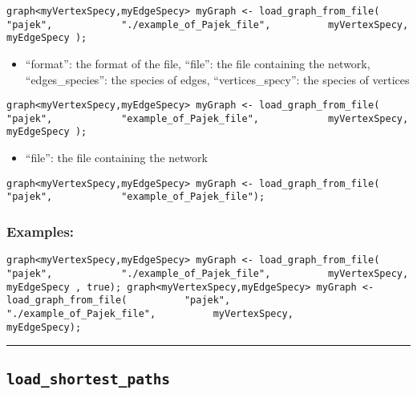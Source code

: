 \documentclass[]{book}
\providecommand{\tightlist}{%
  \setlength{\itemsep}{0pt}\setlength{\parskip}{0pt}}
\theoremstyle{definition}
\theoremstyle{definition}
\theoremstyle{definition}
\theoremstyle{remark}
\begin{document}
\begin{verbatim}
graph<myVertexSpecy,myEdgeSpecy> myGraph <- load_graph_from_file(           "pajek",            "./example_of_Pajek_file",          myVertexSpecy,          myEdgeSpecy ); 
\end{verbatim}

\begin{itemize}
\tightlist
\item
  ``format'': the format of the file, ``file'': the file containing the
  network, ``edges\_species'': the species of edges,
  ``vertices\_specy'': the species of vertices
\end{itemize}

\begin{verbatim}
graph<myVertexSpecy,myEdgeSpecy> myGraph <- load_graph_from_file(           "pajek",            "example_of_Pajek_file",            myVertexSpecy,          myEdgeSpecy ); 
\end{verbatim}

\begin{itemize}
\tightlist
\item
  ``file'': the file containing the network
\end{itemize}

\begin{verbatim}
graph<myVertexSpecy,myEdgeSpecy> myGraph <- load_graph_from_file(           "pajek",            "example_of_Pajek_file"); 
\end{verbatim}

\subsubsection{Examples:}\label{examples-226}

\begin{verbatim}
graph<myVertexSpecy,myEdgeSpecy> myGraph <- load_graph_from_file(           "pajek",            "./example_of_Pajek_file",          myVertexSpecy,          myEdgeSpecy , true); graph<myVertexSpecy,myEdgeSpecy> myGraph <- load_graph_from_file(          "pajek",            "./example_of_Pajek_file",          myVertexSpecy,          myEdgeSpecy); 
\end{verbatim}

\begin{center}\rule{0.5\linewidth}{\linethickness}\end{center}

\subsection{\texorpdfstring{\texttt{load\_shortest\_paths}}{load\_shortest\_paths}}\label{load_shortest_paths}
\end{document}
